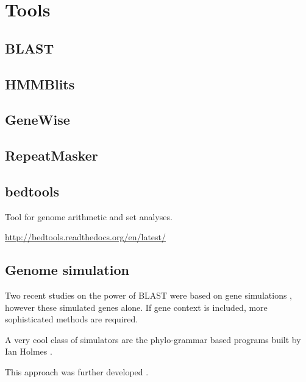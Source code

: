 \section{Tools}

\subsection{BLAST}

\subsection{HMMBlits}

\subsection{GeneWise}

\subsection{RepeatMasker}

\subsection{bedtools}
    Tool for genome arithmetic and set analyses.

    \url{http://bedtools.readthedocs.org/en/latest/}

\subsection{Genome simulation}

Two recent studies on the power of BLAST were based on gene simulations
\cite{moyers_phylostratigraphic_2015,moyers_evaluating_2016}, however these
simulated genes alone. If gene context is included, more sophisticated methods
are required.

A very cool class of simulators are the phylo-grammar based programs built by
Ian Holmes \cite{klosterman_xrate:_2006}. 

This approach was further developed \cite{westesson_developing_2012}.

